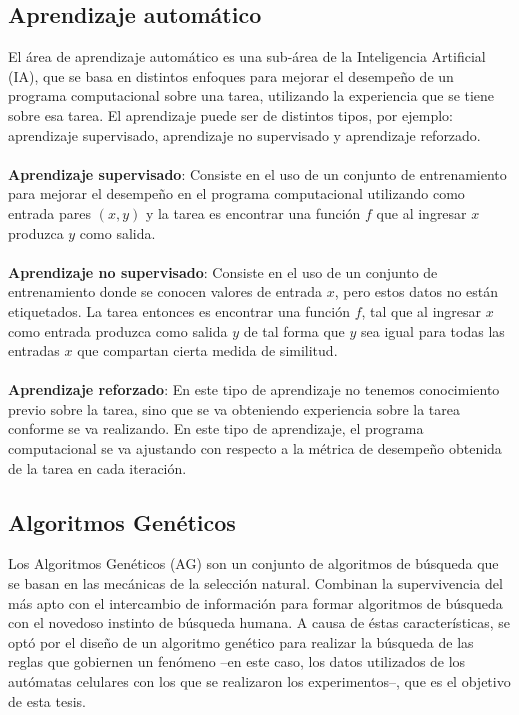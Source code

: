 \subsection{Aprendizaje automático}

El área de aprendizaje automático es una sub-área de la Inteligencia Artificial (IA), que se basa en distintos enfoques para mejorar el desempeño de un programa computacional sobre una tarea, utilizando la experiencia que se tiene sobre esa tarea. El aprendizaje puede ser de distintos tipos, por ejemplo: aprendizaje supervisado, aprendizaje no supervisado y aprendizaje reforzado.
\\
\\
\textbf{Aprendizaje supervisado}: Consiste en el uso de un conjunto de entrenamiento para mejorar el desempeño en el programa computacional utilizando como entrada pares $(x,y)$ y la tarea es encontrar una función $f$ que al ingresar $x$ produzca $y$ como salida. 
\\
\\
\textbf{Aprendizaje no supervisado}: Consiste en el uso de un conjunto de entrenamiento donde se conocen valores de entrada $x$, pero estos datos no están etiquetados. La tarea entonces es encontrar una función $f$, tal que al ingresar $x$ como entrada produzca como salida $y$ de tal forma que $y$ sea igual para todas las entradas $x$ que compartan cierta medida de similitud.
\\
\\
\textbf{Aprendizaje reforzado}: En este tipo de aprendizaje no tenemos conocimiento previo sobre la tarea, sino que se va obteniendo experiencia sobre la tarea conforme se va realizando. En este tipo de aprendizaje, el programa computacional se va ajustando  con respecto a la métrica de desempeño obtenida de la tarea en cada iteración.

\subsection{Algoritmos Genéticos}

Los Algoritmos Genéticos (AG) son un conjunto de algoritmos de búsqueda que se basan en las mecánicas de la selección natural. Combinan la supervivencia del más apto con el intercambio de información para formar algoritmos de búsqueda con el novedoso instinto de búsqueda humana. A causa de éstas características, se optó por el diseño de un algoritmo genético para realizar la búsqueda de las reglas que gobiernen un fenómeno --en este caso, los datos utilizados de los autómatas celulares con los que se realizaron los experimentos--, que es el objetivo de esta tesis. 

